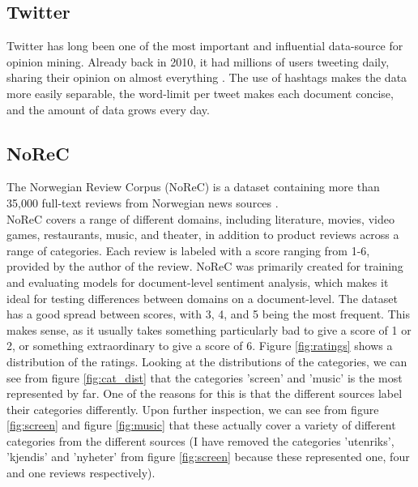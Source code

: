 \documentclass{report}
\begin{document}
\subsection{Twitter}
Twitter has long been one of the most important and influential data-source for opinion mining. Already back in 2010, it had millions of users tweeting daily, sharing their opinion on almost everything \cite{pak-paroubek-2010-twitter}. The use of hashtags makes the data more easily separable, the word-limit per tweet makes each document concise, and the amount of data grows every day. 


\subsection{NoReC}
The Norwegian Review Corpus (NoReC) is a dataset containing more than 35,000 full-text reviews from Norwegian news sources \cite{VelOvrBer18}.\\
NoReC covers a range of different domains, including literature, movies, video games, restaurants, music, and theater, in addition to product reviews across a range of categories. Each review is labeled with a score ranging from 1-6, provided by the author of the review. NoReC was primarily created for training and evaluating models for document-level sentiment analysis, which makes it ideal for testing differences between domains on a document-level. The dataset has a good spread between scores, with 3, 4, and 5 being the most frequent. This makes sense, as it usually takes something particularly bad to give a score of 1 or 2, or something extraordinary to give a score of 6. Figure \ref{fig:ratings} shows a distribution of the ratings. Looking at the distributions of the categories, we can see from figure \ref{fig:cat_dist} that the categories 'screen' and 'music' is the most represented by far. One of the reasons for this is that the different sources label their categories differently. Upon further inspection, we can see from figure \ref{fig:screen} and figure \ref{fig:music} that these actually cover a variety of different categories from the different sources (I have removed the categories 'utenriks', 'kjendis' and 'nyheter' from figure \ref{fig:screen} because these represented one, four and one reviews respectively).
\end{document}
